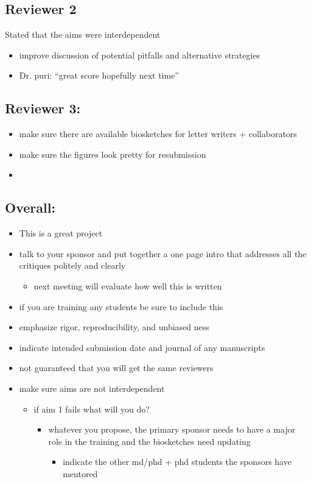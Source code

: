 \documentclass[11pt]{article}
\begin{document}
\subsection{Reviewer 2}
\label{sec:orgec7a504}
Stated that the aims were interdependent
\begin{itemize}
\item improve discussion of potential pitfalls and alternative strategies
\item Dr. puri: ``great score hopefully next time''
\end{itemize}
\subsection{Reviewer 3:}
\label{sec:org9271894}
\begin{itemize}
\item make sure there are available biosketches for letter writers + collaborators
\item make sure the figures look pretty for resubmission
\item 
\end{itemize}
\subsection{Overall:}
\label{sec:org9f2655a}
\begin{itemize}
\item This is a great project
\item talk to your sponsor and put together a one page intro that addresses all the critiques politely and clearly
\begin{itemize}
\item next meeting will evaluate how well this is written
\end{itemize}
\item if you are training any students be sure to include this
\item emphasize rigor, reproducibility, and unbiased ness
\item indicate intended submission date and journal of any manuscripts
\item not guaranteed that you will get the same reviewers
\item make sure aims are not interdependent
\begin{itemize}
\item if aim 1 fails what will you do?
\begin{itemize}
\item whatever you propose, the primary sponsor needs to have a major role in the training and the biosketches need updating
\begin{itemize}
\item indicate the other md/phd + phd students the sponsors have mentored
\end{itemize}
\end{itemize}
\end{itemize}
\end{itemize}
\end{document}

